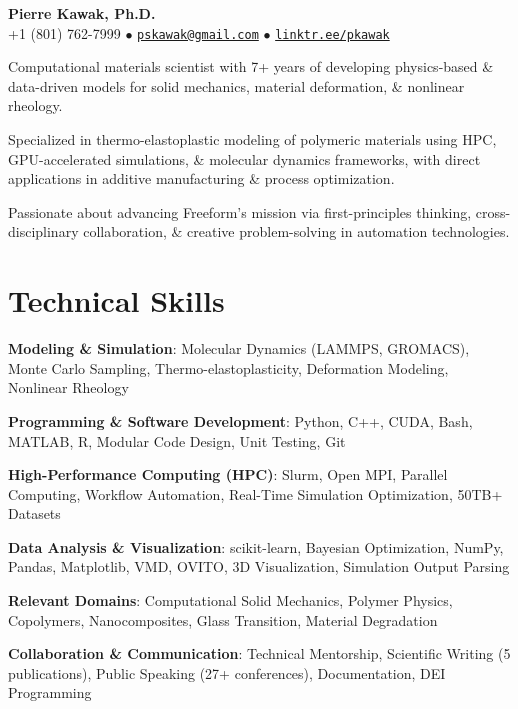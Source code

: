 \begin{center}
  {\LARGE \textbf{Pierre Kawak, Ph.D.} }\\[1ex]
  +1 (801) 762-7999 $\bullet$ \href{mailto:pskawak@gmail.com}{\tt pskawak@gmail.com} $\bullet$ \href{https://linktr.ee/pkawak}{\tt linktr.ee/pkawak}\\
\end{center}
\begin{tabitemize}
  \item Computational materials scientist with 7+ years of developing physics-based \& data-driven models for solid mechanics, material deformation, \& nonlinear rheology.
  \item Specialized in thermo-elastoplastic modeling of polymeric materials using HPC, GPU-accelerated simulations, \& molecular dynamics frameworks, with direct applications in additive manufacturing \& process optimization.
  \item Passionate about advancing Freeform's mission via first-principles thinking, cross-disciplinary collaboration, \& creative problem-solving in automation technologies.
\end{tabitemize}
\vspace{-1.0\baselineskip}
\section*{Technical Skills}
\begin{tabitemize}
  \item \textbf{Modeling \& Simulation}: Molecular Dynamics (LAMMPS, GROMACS), Monte Carlo Sampling, Thermo-elastoplasticity, Deformation Modeling, Nonlinear Rheology
  \item \textbf{Programming \& Software Development}: Python, C++, CUDA, Bash, MATLAB, R, Modular Code Design, Unit Testing, Git
  \item \textbf{High-Performance Computing (HPC)}: Slurm, Open MPI, Parallel Computing, Workflow Automation, Real-Time Simulation Optimization, 50TB+ Datasets
  \item \textbf{Data Analysis \& Visualization}: scikit-learn, Bayesian Optimization, NumPy, Pandas, Matplotlib, VMD, OVITO, 3D Visualization, Simulation Output Parsing
  \item \textbf{Relevant Domains}: Computational Solid Mechanics, Polymer Physics, Copolymers, Nanocomposites, Glass Transition, Material Degradation
  \item \textbf{Collaboration \& Communication}: Technical Mentorship, Scientific Writing (5 publications), Public Speaking (27+ conferences), Documentation, DEI Programming
\end{tabitemize}
\vspace{-1.2\baselineskip}
